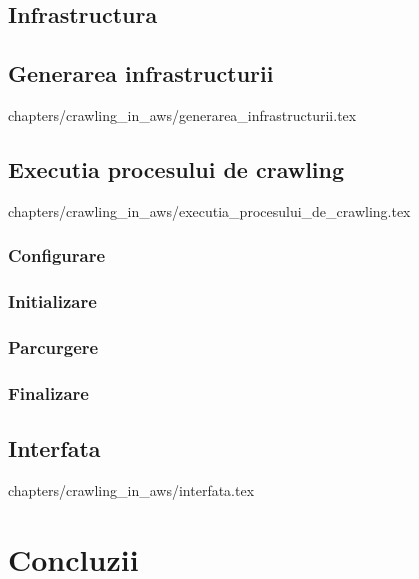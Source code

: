 \documentclass[12pt,oneside]{report}
\newcommand{\chaptertitle}[1]{\LARGE{#1}}
\begin{document}
\setcounter{section}{0}

\section{Infrastructura}

\clearpage

\section{Generarea infrastructurii}
 {
	chapters/crawling_in_aws/generarea_infrastructurii.tex
}
\clearpage

\section{Executia procesului de crawling}
 {
	chapters/crawling_in_aws/executia_procesului_de_crawling.tex
}

\subsection{Configurare}

\clearpage

\subsection{Initializare}


\subsection{Parcurgere}


\subsection{Finalizare}

\clearpage

\section{Interfata}
 {
	chapters/crawling_in_aws/interfata.tex
}
\clearpage

\setcounter{section}{0}
\chapter*{\chaptertitle{Concluzii}}

\end{document}
